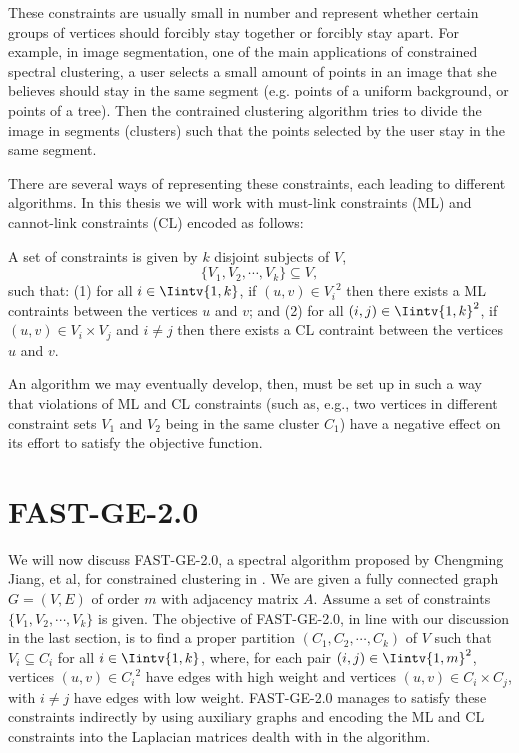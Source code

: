 These constraints are usually small in number and represent whether certain groups of vertices should forcibly stay together or forcibly stay apart.
For example, in image segmentation, one of the main applications of constrained spectral clustering, a user selects a small amount of points in an image that she believes should stay in the same segment (e.g. points of a uniform background, or points of a tree). Then the contrained clustering algorithm tries to divide the image in segments (clusters) such that the points selected by the user stay in the same segment.


There are several ways of representing these constraints, each leading to different algorithms. 
In this thesis we will work with must-link constraints (ML) and cannot-link constraints (CL) encoded as follows:

A set of constraints is given by $k$ disjoint subjects of $V$,
\begin{equation}
   \{ V_1, V_2, \cdots, V_k \} \subseteq V,
\end{equation}
such that: (1) for all $i \in \Iintv{1,k}$, if $(u,v) \in {V_i}^2$ then there exists a ML contraints between the vertices $u$ and $v$; and (2) for all $(i,j) \in \Iintv{1,k}^2$, if $(u,v) \in V_i \times V_j$ and $i \ne j$ then there exists a CL contraint between the vertices $u$ and $v$. 

An algorithm we may eventually develop, then, must be set up in such a way that violations of ML and CL constraints (such as, e.g., two vertices in different constraint sets $V_1$ and $V_2$ being in the same cluster $C_1$) have a negative effect on its effort to satisfy the objective function.

\section{FAST-GE-2.0}
We will now discuss FAST-GE-2.0, a spectral algorithm proposed by Chengming Jiang, et al, for constrained clustering in \cite{fastge2}.
We are given a fully connected graph $G = (V,E)$ of order $m$ with adjacency matrix $A$.
Assume a set of constraints $\{V_1, V_2, \cdots, V_k \}$ is given.
The objective of FAST-GE-2.0, in line with our discussion in the last section, is to find a proper partition $(C_1, C_2, \cdots, C_k)$ of $V$ such that $V_i \subseteq C_i$ for all $i \in \Iintv{1,k}$, where, for each pair $(i,j) \in \Iintv{1,m}^2$, vertices $(u,v) \in {C_i}^2$ have edges with high weight and vertices $(u,v) \in {C_i} \times {C_j}$, with $i \ne j$ have edges with low weight.
FAST-GE-2.0 manages to satisfy these constraints indirectly by using auxiliary graphs and encoding the ML and CL constraints into the Laplacian matrices dealth with in the algorithm.

